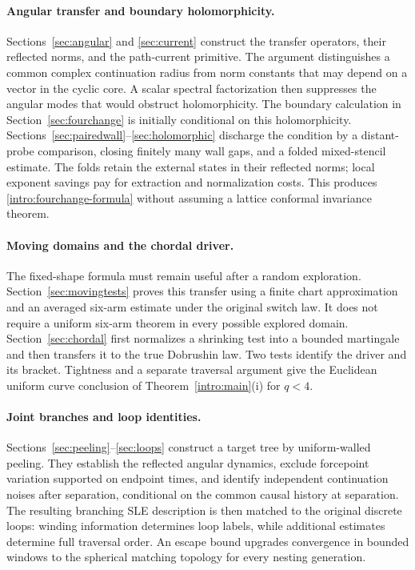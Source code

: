 \paragraph{Angular transfer and boundary holomorphicity.}
Sections~\ref{sec:angular} and \ref{sec:current} construct the transfer
operators, their reflected norms, and the path-current primitive.
The argument distinguishes a common complex continuation radius from
norm constants that may depend on a vector in the cyclic core.  A
scalar spectral factorization then suppresses the angular modes that
would obstruct holomorphicity.  The boundary calculation in
Section~\ref{sec:fourchange} is initially conditional on this
holomorphicity.  Sections~\ref{sec:pairedwall}--\ref{sec:holomorphic}
discharge the condition by a distant-probe comparison, closing finitely
many wall gaps, and a folded mixed-stencil estimate.  The folds retain
the external states in their reflected norms; local exponent savings
pay for extraction and normalization costs.  This produces
\eqref{intro:fourchange-formula} without assuming a lattice conformal
invariance theorem.

\paragraph{Moving domains and the chordal driver.}
The fixed-shape formula must remain useful after a random exploration.
Section~\ref{sec:movingtests} proves this transfer using a finite chart
approximation and an averaged six-arm estimate under the original
switch law.  It does not require a uniform six-arm theorem in every
possible explored domain.  Section~\ref{sec:chordal} first normalizes a
shrinking test into a bounded martingale and then transfers it to the
true Dobrushin law.  Two tests identify the driver and its bracket.
Tightness and a separate traversal argument give the Euclidean uniform
curve conclusion of Theorem~\ref{intro:main}(i) for $q<4$.

\paragraph{Joint branches and loop identities.}
Sections~\ref{sec:peeling}--\ref{sec:loops} construct a target tree by
uniform-walled peeling.  They establish the reflected angular dynamics,
exclude forcepoint variation supported on endpoint times, and identify
independent continuation noises after separation, conditional on the
common causal history at separation.  The resulting branching SLE description is then matched
to the original discrete loops: winding information determines loop
labels, while additional estimates determine full traversal order.
An escape bound upgrades convergence in bounded windows to the
spherical matching topology for every nesting generation.

